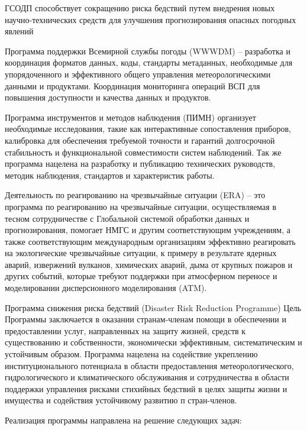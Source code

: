 ГСОДП способствует сокращению риска бедствий путем внедрения новых научно-технических средств для улучшения прогнозирования опасных погодных явлений 

Программа поддержки Всемирной службы погоды (WWWDM) – разработка и координация форматов данных, коды, стандарты метаданных, необходимые для упорядоченного и эффективного общего управления метеорологическими данными и продуктами. Координация мониторинга операций ВСП для повышения доступности и качества данных и продуктов.

Программа инструментов и методов наблюдения (ПИМН) организует необходимые исследования, такие как интерактивные сопоставления приборов, калибровка для обеспечения требуемой точности и гарантий долгосрочной стабильность и функциональной совместимости систем наблюдений. Так же программа нацелена на разработку и публикацию технических руководств, методик наблюдения, стандартов и характеристик работы.

Деятельность по реагированию на чрезвычайные ситуации (ERA) – это программа по реагированию на чрезвычайные ситуации, осуществляемая в тесном сотрудничестве с Глобальной системой обработки данных и прогнозирования, помогает НМГС и другим соответствующим учреждениям, а также соответствующим международным организациям эффективно реагировать на экологические чрезвычайные ситуации, к примеру в результате ядерных аварий, извержений вулканов, химических аварий, дыма от крупных пожаров и других событий, которые требуют поддержки при атмосферном переносе и моделировании дисперсионного моделирования (ATM). 

Программа снижения риска бедствий (Disaster Risk Reduction Programme) Цель Программы заключается в оказании странам-членам помощи в обеспечении и предоставлении услуг, направленных на защиту жизней, средств к существованию и собственности, экономически эффективным, систематическим и устойчивым образом. Программа нацелена на содействие укреплению институционального потенциала в области предоставления метеорологического, гидрологического и климатического обслуживания и сотрудничества в области поддержки управления рисками стихийных бедствий в целях защиты жизни и имущества и содействия устойчивому развитию п стран-членов.

Реализация программы направлена на решение следующих задач: 

